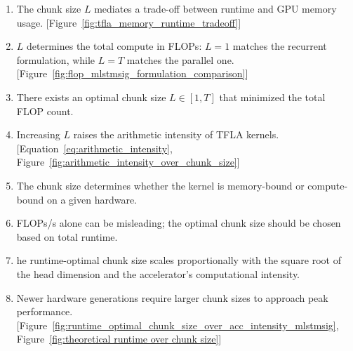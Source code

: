 \documentclass{article}
\begin{document}
    \begin{enumerate}[itemsep=0pt,topsep=0pt]
        \item The chunk size $L$ mediates a trade-off between runtime and GPU memory usage. [Figure~\ref{fig:tfla_memory_runtime_tradeoff}] 
        \item $L$ determines the total compute in FLOPs: $L=1$ matches the recurrent formulation, while $L=T$ matches the parallel one. [Figure~\ref{fig:flop_mlstmsig_formulation_comparison}]
        \item There exists an optimal chunk size $L \in [1, T]$ that minimized the total FLOP count. 
        \item Increasing $L$ raises the arithmetic intensity of TFLA kernels. [Equation~\eqref{eq:arithmetic_intensity}, Figure~\ref{fig:arithmetic_intensity_over_chunk_size}]
        \item The chunk size determines whether the kernel is memory-bound or compute-bound on a given hardware. 
        \item FLOPs/s alone can be misleading; the optimal chunk size should be chosen based on total runtime. 
        \item he runtime-optimal chunk size scales proportionally with the square root of the head dimension and the accelerator’s computational intensity. 
        \item Newer hardware generations require larger chunk sizes to approach peak performance. [Figure~\ref{fig:runtime_optimal_chunk_size_over_acc_intensity_mlstmsig}, Figure~\ref{fig:theoretical runtime over chunk size}]
    \end{enumerate}
\end{document}
